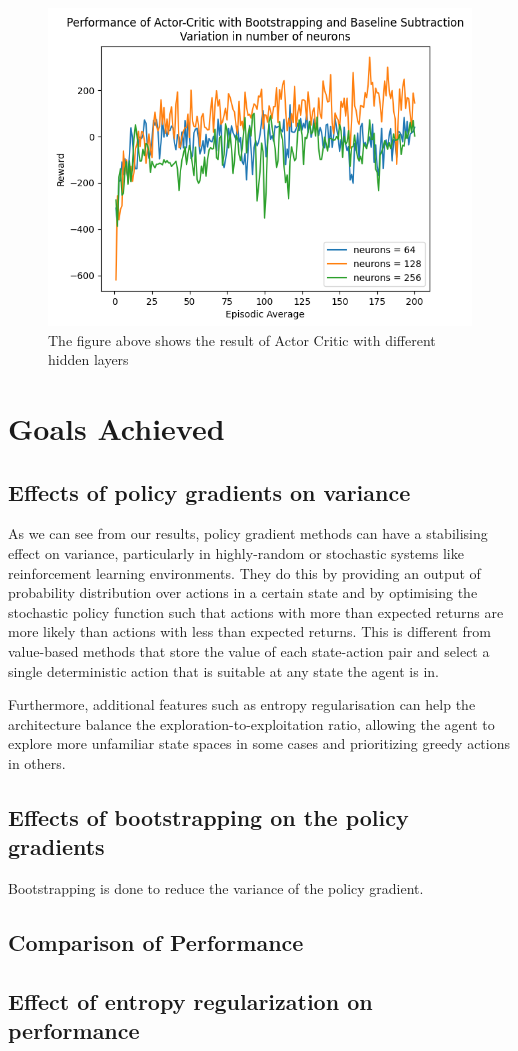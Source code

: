 \documentclass{article}
\begin{document}
\begin{figure}[htbp]
\centering
\includegraphics[width=0.9\linewidth]{Report/images/12.Performance_of_Actor_Critic_BSandBS_Neurons.png}
\caption{\label{fig:ActorCriticBS2-different hidden layers}The figure above shows the result of Actor Critic with different hidden layers}
\end{figure}

\section{Goals Achieved}
\subsection{Effects of policy gradients on variance}
As we can see from our results, policy gradient methods can have a stabilising effect on variance, particularly in highly-random or stochastic systems like reinforcement learning environments. They do this by providing an output of  probability distribution over actions in a certain state and by optimising the stochastic policy function such that actions with more than expected returns are more likely than actions with less than expected returns. This is different from value-based methods that store the value of each state-action pair and select a single deterministic action that is suitable at any state the agent is in.  
\par Furthermore, additional features such as entropy regularisation can help the architecture balance the exploration-to-exploitation ratio, allowing the agent to explore more unfamiliar state spaces in some cases and prioritizing greedy actions in others. 
\subsection{Effects of bootstrapping on the policy gradients}
Bootstrapping is done to reduce the variance of the policy gradient. 
\subsection{Comparison of Performance}
\subsection{Effect of entropy regularization on performance}



\end{document}
